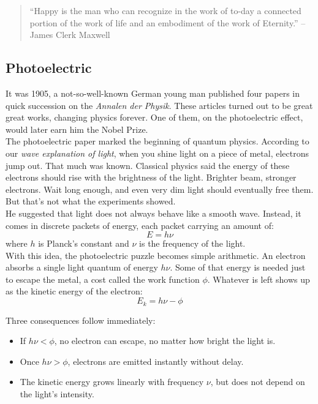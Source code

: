 \documentclass{article}
\begin{document}
\begin{quote}
    ``Happy is the man who can recognize in the work of to-day a connected portion of the work of life and an embodiment of the work of Eternity.'' -- James Clerk Maxwell
\end{quote}

\subsection{Photoelectric}
It was 1905, a not-so-well-known German young man published four papers in quick succession on the \textit{Annalen der Physik}. These articles turned out to be great great works, changing physics forever. One of them, on the photoelectric effect, would later earn him the Nobel Prize.\\

The photoelectric paper marked the beginning of quantum physics. 
According to our \textit{wave explanation of light}, when you shine light on a piece of metal, electrons jump out. That much was known. Classical physics said the energy of these electrons should rise with the brightness of the light. Brighter beam, stronger electrons. Wait long enough, and even very dim light should eventually free them. \\

But that’s not what the experiments showed.\\

He suggested that light does not always behave like a smooth wave. Instead, it comes in discrete packets of energy, each packet carrying an amount of:
\[
E = h\nu 
\]
where $h$ is Planck’s constant and $\nu$ is the frequency of the light.\\

With this idea, the photoelectric puzzle becomes simple arithmetic. An electron 
absorbs a single light quantum of energy $h\nu$. Some of that energy is needed 
just to escape the metal, a cost called the work function $\phi$. Whatever is left 
shows up as the kinetic energy of the electron:
\[
E_k = h\nu - \phi 
\]


Three consequences follow immediately:
\begin{itemize} \item If $h\nu < \phi$, no electron can escape, no matter how bright the light is. \item Once $h\nu > \phi$, electrons are emitted instantly without delay. \item The kinetic energy grows linearly with frequency $\nu$, but does not depend on the light’s intensity. \end{itemize}
\end{document}
